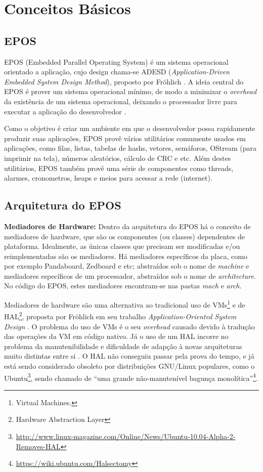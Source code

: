 \chapter{Conceitos Básicos}

\section{EPOS}

EPOS (Embedded Parallel Operating System) é um sistema operacional orientado a aplicação, cujo design chama-se ADESD (\emph{Application-Driven Embedded System Design Method}), proposto por Fröhlich \cite{guto_thesis}. A ideia central do EPOS é prover um sistema operacional mínimo, de modo a minimizar o \emph{overhead} da existência de um sistema operacional, deixando o processador livre para executar a aplicação do desenvolvedor \cite{epos_user_guide}.

Como o objetivo é criar um ambiente em que o desenvolvedor possa rapidamente produzir suas aplicações, EPOS provê vários utilitários comumente usados em aplicações, como filas, listas, tabelas de hashs, vetores, semáforos, OStream (para imprimir na tela), números aleatórios, cálculo de CRC e etc. Além destes utilitários, EPOS também provê uma série de componentes como threads, alarmes, cronometros, heaps e meios para acessar a rede (internet).

\section{Arquitetura do EPOS}

\textbf{Mediadores de Hardware:} Dentro da arquitetura do EPOS há o conceito de mediadores de hardware, que são os componentes (ou classes) dependentes de plataforma. Idealmente, as únicas classes que precisam ser modificadas e/ou reimplementadas são os mediadores. Há mediadores específicos da placa, como por exemplo Pandaboard, Zedboard e etc; abstraídos sob o nome de \emph{machine} e mediadores específicos de um processador, abstraídos sob o nome de \emph{architecture}. No código do EPOS, estes mediadores encontram-se nas pastas \emph{mach} e \emph{arch}.

Mediadores de hardware são uma alternativa ao tradicional uso de VMs\footnote{Virtual Machines.} e de HAL\footnote{Hardware Abstraction Layer}, proposta por Fröhlich em seu trabalho \emph{Application-Oriented System Design} \cite{guto_thesis}. O problema do uso de VMs é o seu \emph{overhead} causado devido à tradução das operações da VM em código nativo. Já o uso de um HAL incorre no problema da manutenibilidade e dificuldade de adapção à novas arquiteturas muito distintas entre si \cite{hw_mediators}. O HAL não conseguiu passar pela prova do tempo, e já está sendo considerado obsoleto por distribuições GNU/Linux populares, como o 
Ubuntu\footnote{\url{http://www.linux-magazine.com/Online/News/Ubuntu-10.04-Alpha-2-Removes-HAL}}, sendo chamado de ``uma grande não-manutenível bagunça monolítica''\footnote{\url{https://wiki.ubuntu.com/Halsectomy}}.



